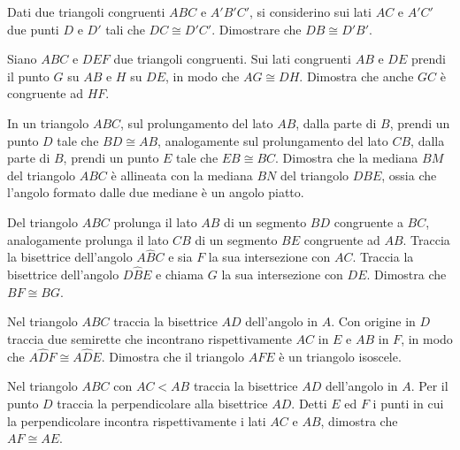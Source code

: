 \begin{multicols}{2}
\begin{esercizio}
\label{ese:2.12}
Dati due triangoli congruenti $ABC$ e $A'B'C'$, si considerino sui lati $AC$ e $A'C'$ due punti $D$ e $D'$ tali che $DC\cong D'C'$.  Dimostrare che $DB\cong D'B'$.
\end{esercizio}

\begin{esercizio}
\label{ese:2.13}
Siano $ABC$ e $DEF$ due triangoli congruenti. Sui lati congruenti $AB$ e $DE$ prendi il punto $G$ su $AB$ e $H$ su $DE$, in modo che $AG\cong DH$. Dimostra che anche $GC$ è congruente ad $HF$.
\end{esercizio}

\begin{esercizio}
\label{ese:2.14}
In un triangolo $ABC$, sul prolungamento del lato $AB$, dalla parte di $B$, prendi un punto $D$ tale che $BD\cong AB$, analogamente sul prolungamento del lato $CB$, dalla parte di $B$, prendi un punto $E$ tale che $EB\cong BC$. Dimostra che la mediana $BM$ del triangolo $ABC$ è allineata con la mediana $BN$ del triangolo $DBE$, ossia che l'angolo formato dalle due mediane è un angolo piatto.
\end{esercizio}

\begin{esercizio}
\label{ese:2.15}
Del triangolo $ABC$ prolunga il lato $AB$ di un segmento $BD$ congruente a $BC$, analogamente prolunga il lato $CB$ di un segmento $BE$ congruente ad $AB$. Traccia la bisettrice dell'angolo $A\widehat{B}C$ e sia $F$ la sua intersezione con $AC$. Traccia la bisettrice dell'angolo $D\widehat{B}E$ e chiama $G$ la sua intersezione con $DE$. Dimostra che $BF\cong BG$.
\end{esercizio}

\begin{esercizio}
\label{ese:2.16}
Nel triangolo $ABC$ traccia la bisettrice $AD$ dell'angolo in $A$. Con origine in $D$ traccia due semirette che incontrano rispettivamente $AC$ in $E$ e $AB$ in $F$, in modo che $A\widehat{D}F\cong A\widehat{D}E$. Dimostra che il triangolo $AFE$ è un triangolo isoscele.
\end{esercizio}

\begin{esercizio}
\label{ese:2.17}
Nel triangolo $ABC$ con $AC<AB$ traccia la bisettrice $AD$ dell'angolo in $A$. Per il punto $D$ traccia la perpendicolare alla bisettrice $AD$. Detti $E$ ed $F$ i punti in cui la perpendicolare incontra rispettivamente i lati $AC$ e $AB$, dimostra che $AF\cong AE$.
\end{esercizio}


\end{multicols}
